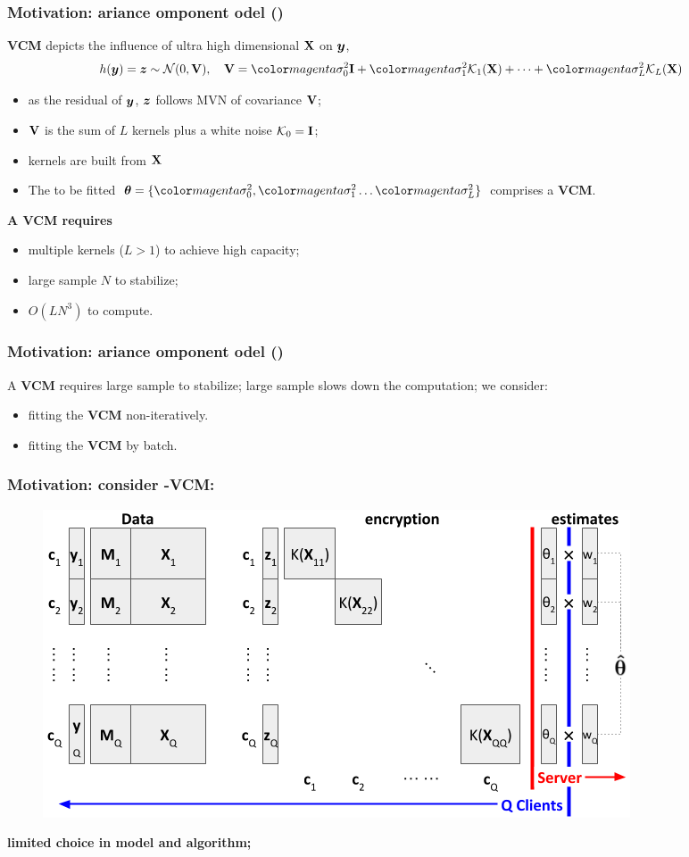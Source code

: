 \documentclass{beamer}
\begin{document}
\begin{frame}
  \frametitle{Motivation: ariance omponent
    odel ()} %
  \textbf{VCM} depicts the influence of ultra high dimensional $\mathbf{X}$
  on ${\bm{y}}$,
  \begin{align}\label{eq:vcm}
    h(\vy) = \vz \sim \mathcal{N}(0, \xv), \quad
    \xv = \fit{\sigma^2_0} \id + \fit{\sigma^2_1} \mck_1(\xx) + \dots + \fit{\sigma^2_L} \mck_L(\xx)
  \end{align}
  \begin{itemize}
  \item as the residual of ${\bm{y}}$, ${\bm{z}}$ follows MVN of covariance
    $\mathbf{V}$;
  \item $\mathbf{V}$ is the sum of $L$ kernels plus a white noise
    $\mathcal{K}_0 = \textbf{I}$;
  \item kernels are built from $\mathbf{X}$
  \item The to be fitted
    $\vtheta = \{\fit{\sigma^2_0}, \fit{\sigma^2_1} \dots
    \fit{\sigma^2_L}\}$ comprises a \textbf{VCM}.
  \end{itemize}
  \textbf{A VCM requires}
  \begin{itemize}
  \item multiple kernels ($L>1$) to achieve high capacity;
  \item large sample $N$ to stabilize;
  \item $O(L N^3)$ to compute.
  \end{itemize}
\end{frame}
\begin{frame}
  \frametitle{Motivation: ariance omponent
    odel ()} %
  A \textbf{VCM} requires large sample to stabilize; large sample
  slows down the computation; we consider:
  \begin{itemize}
  \item fitting the \textbf{VCM} non-iteratively.
  \item fitting the \textbf{VCM} by batch.
  \end{itemize}
\end{frame}
\begin{frame}\frametitle{Motivation: \textbf{consider
      -VCM:}} %
  \begin{figure}\includegraphics[width=.90\textwidth]{img/meta0}\end{figure}
  \textbf{}  \textbf{limited choice in model and
    algorithm;}
\end{frame}
\end{document}

